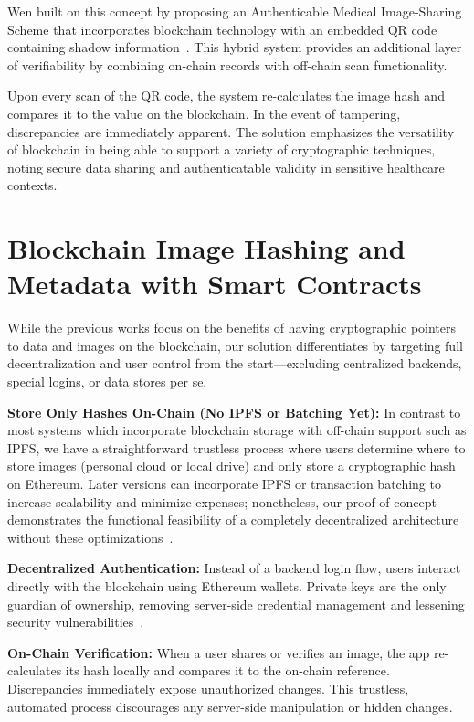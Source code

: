 Wen built on this concept by proposing an Authenticable Medical Image-Sharing Scheme that
incorporates blockchain technology with an embedded QR code containing shadow information~\cite{wen2022}.
This hybrid system provides an additional layer of verifiability by combining on-chain records with
off-chain scan functionality.

Upon every scan of the QR code, the system re-calculates the image hash and compares it to the value
on the blockchain. In the event of tampering, discrepancies are immediately apparent. The solution
emphasizes the versatility of blockchain in being able to support a variety of cryptographic techniques,
noting secure data sharing and authenticatable validity in sensitive healthcare contexts.


\section{Blockchain Image Hashing and Metadata with Smart Contracts}
While the previous works focus on the benefits of having cryptographic pointers to data and images
on the blockchain, our solution differentiates by targeting full decentralization and user control
from the start---excluding centralized backends, special logins, or data stores per se.

\textbf{Store Only Hashes On-Chain (No IPFS or Batching Yet):}
In contrast to most systems which incorporate blockchain storage with off-chain support such as IPFS,
we have a straightforward trustless process where users determine where to store images (personal cloud
or local drive) and only store a cryptographic hash on Ethereum. Later versions can incorporate IPFS or
transaction batching to increase scalability and minimize expenses; nonetheless, our proof-of-concept
demonstrates the functional feasibility of a completely decentralized architecture without these
optimizations~\cite{chunmiao2021,andrade2022}.

\textbf{Decentralized Authentication:}
Instead of a backend login flow, users interact directly with the blockchain using Ethereum wallets.
Private keys are the only guardian of ownership, removing server-side credential management and
lessening security vulnerabilities~\cite{cheng2020}.

\textbf{On-Chain Verification:}
When a user shares or verifies an image, the app re-calculates its hash locally and compares it to the
on-chain reference. Discrepancies immediately expose unauthorized changes. This trustless, automated
process discourages any server-side manipulation or hidden changes.

